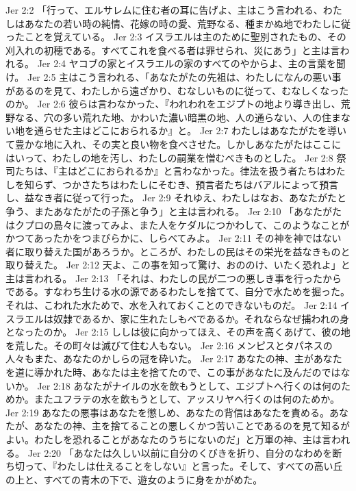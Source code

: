Jer 2:2  「行って、エルサレムに住む者の耳に告げよ、主はこう言われる、わたしはあなたの若い時の純情、花嫁の時の愛、荒野なる、種まかぬ地でわたしに従ったことを覚えている。
Jer 2:3  イスラエルは主のために聖別されたもの、その刈入れの初穂である。すべてこれを食べる者は罪せられ、災にあう」と主は言われる。
Jer 2:4  ヤコブの家とイスラエルの家のすべてのやからよ、主の言葉を聞け。
Jer 2:5  主はこう言われる、「あなたがたの先祖は、わたしになんの悪い事があるのを見て、わたしから遠ざかり、むなしいものに従って、むなしくなったのか。
Jer 2:6  彼らは言わなかった、『われわれをエジプトの地より導き出し、荒野なる、穴の多い荒れた地、かわいた濃い暗黒の地、人の通らない、人の住まない地を通らせた主はどこにおられるか』と。
Jer 2:7  わたしはあなたがたを導いて豊かな地に入れ、その実と良い物を食べさせた。しかしあなたがたはここにはいって、わたしの地を汚し、わたしの嗣業を憎むべきものとした。
Jer 2:8  祭司たちは、『主はどこにおられるか』と言わなかった。律法を扱う者たちはわたしを知らず、つかさたちはわたしにそむき、預言者たちはバアルによって預言し、益なき者に従って行った。
Jer 2:9  それゆえ、わたしはなお、あなたがたと争う、またあなたがたの子孫と争う」と主は言われる。
Jer 2:10  「あなたがたはクプロの島々に渡ってみよ、また人をケダルにつかわして、このようなことがかつてあったかをつまびらかに、しらべてみよ。
Jer 2:11  その神を神ではない者に取り替えた国があろうか。ところが、わたしの民はその栄光を益なきものと取り替えた。
Jer 2:12  天よ、この事を知って驚け、おののけ、いたく恐れよ」と主は言われる。
Jer 2:13  「それは、わたしの民が二つの悪しき事を行ったからである。すなわち生ける水の源であるわたしを捨てて、自分で水ためを掘った。それは、こわれた水ためで、水を入れておくことのできないものだ。
Jer 2:14  イスラエルは奴隷であるか、家に生れたしもべであるか。それならなぜ捕われの身となったのか。
Jer 2:15  ししは彼に向かってほえ、その声を高くあげて、彼の地を荒した。その町々は滅びて住む人もない。
Jer 2:16  メンピスとタパネスの人々もまた、あなたのかしらの冠を砕いた。
Jer 2:17  あなたの神、主があなたを道に導かれた時、あなたは主を捨てたので、この事があなたに及んだのではないか。
Jer 2:18  あなたがナイルの水を飲もうとして、エジプトへ行くのは何のためか。またユフラテの水を飲もうとして、アッスリヤへ行くのは何のためか。
Jer 2:19  あなたの悪事はあなたを懲しめ、あなたの背信はあなたを責める。あなたが、あなたの神、主を捨てることの悪しくかつ苦いことであるのを見て知るがよい。わたしを恐れることがあなたのうちにないのだ」と万軍の神、主は言われる。
Jer 2:20  「あなたは久しい以前に自分のくびきを折り、自分のなわめを断ち切って、『わたしは仕えることをしない』と言った。そして、すべての高い丘の上と、すべての青木の下で、遊女のように身をかがめた。
